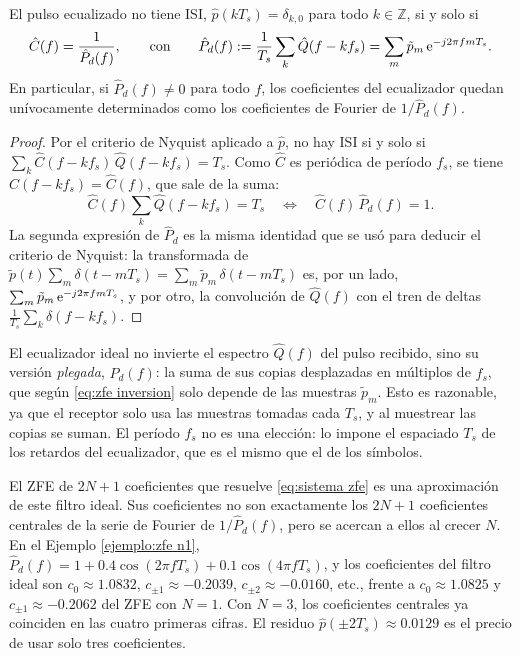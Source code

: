 \begin{teorema}\label{teorema:zfe inversion}
El pulso ecualizado no tiene ISI, $\hat p(kT_s)=\delta_{k,0}$ para todo $k\in\mathbb Z$, si y solo si
\begin{equation}\label{eq:zfe inversion}
    \hat C(f) = \frac{1}{\hat P_d(f)}, \qquad\text{con}\qquad \hat P_d(f) := \frac{1}{T_s}\sum_{k} \hat Q(f-kf_s) = \sum_{m} \tilde p_m\,\mathrm{e}^{-j2\pi f mT_s}.
\end{equation}
En particular, si $\hat P_d(f)\neq 0$ para todo $f$, los coeficientes del ecualizador quedan unívocamente determinados como los coeficientes de Fourier de $1/\hat P_d(f)$.
\end{teorema}
\begin{proof}
Por el criterio de Nyquist aplicado a $\hat p$, no hay ISI si y solo si $\sum_k \hat C(f-kf_s)\,\hat Q(f-kf_s) = T_s$. Como $\hat C$ es periódica de período $f_s$, se tiene $\hat C(f-kf_s)=\hat C(f)$, que sale de la suma:
\begin{equation*}
    \hat C(f)\sum_k \hat Q(f-kf_s) = T_s \quad\Longleftrightarrow\quad \hat C(f)\,\hat P_d(f)=1.
\end{equation*}
La segunda expresión de $\hat P_d$ es la misma identidad que se usó para deducir el criterio de Nyquist: la transformada de $\tilde p(t)\sum_m\delta(t-mT_s)=\sum_m\tilde p_m\,\delta(t-mT_s)$ es, por un lado, $\sum_m\tilde p_m\,\mathrm{e}^{-j2\pi fmT_s}$, y por otro, la convolución de $\hat Q(f)$ con el tren de deltas $\frac{1}{T_s}\sum_k\delta(f-kf_s)$.
\end{proof}

El ecualizador ideal no invierte el espectro $\hat Q(f)$ del pulso recibido, sino su versión \emph{plegada}, $\hat P_d(f)$: la suma de sus copias desplazadas en múltiplos de $f_s$, que según \eqref{eq:zfe inversion} solo depende de las muestras $\tilde p_m$. Esto es razonable, ya que el receptor solo usa las muestras tomadas cada $T_s$, y al muestrear las copias se suman. El período $f_s$ no es una elección: lo impone el espaciado $T_s$ de los retardos del ecualizador, que es el mismo que el de los símbolos.

El ZFE de $2N+1$ coeficientes que resuelve \eqref{eq:sistema zfe} es una aproximación de este filtro ideal. Sus coeficientes no son exactamente los $2N+1$ coeficientes centrales de la serie de Fourier de $1/\hat P_d(f)$, pero se acercan a ellos al crecer $N$. En el Ejemplo \ref{ejemplo:zfe n1}, $\hat P_d(f)=1+0.4\cos(2\pi fT_s)+0.1\cos(4\pi fT_s)$, y los coeficientes del filtro ideal son $c_0\approx 1.0832$, $c_{\pm 1}\approx -0.2039$, $c_{\pm 2}\approx -0.0160$, etc., frente a $c_0\approx 1.0825$ y $c_{\pm1}\approx -0.2062$ del ZFE con $N=1$. Con $N=3$, los coeficientes centrales ya coinciden en las cuatro primeras cifras. El residuo $\hat p(\pm 2T_s)\approx 0.0129$ es el precio de usar solo tres coeficientes.

